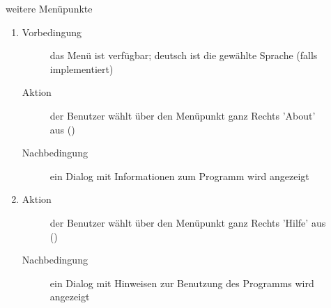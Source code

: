 \begin{description}
	\item[] weitere Menüpunkte
	\begin{enumerate}
		\item
		\begin{description}
			\item[Vorbedingung] das Menü ist verfügbar; deutsch ist die gewählte Sprache (falls  implementiert)
			\item[Aktion] der Benutzer wählt über den Menüpunkt ganz Rechts 'About' aus ()
			\item[Nachbedingung] ein Dialog mit Informationen zum Programm wird angezeigt
		\end{description}
		\item
		\begin{description}
			\item[Aktion] der Benutzer wählt über den Menüpunkt ganz Rechts 'Hilfe' aus ()
			\item[Nachbedingung] ein Dialog mit Hinweisen zur Benutzung des Programms wird angezeigt
		\end{description}
	\end{enumerate}
\end{description}
